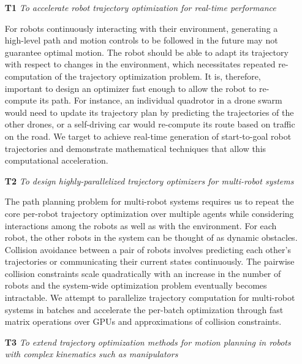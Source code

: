 \begin{enumerate}
    \item[\textbf{T1}] \textit{To accelerate robot trajectory optimization for real-time performance}\label{enum:problems-addressed-by-thesis}

    For robots continuously interacting with their environment, generating a high-level path and motion controls to be followed in the future may not guarantee optimal motion. The robot should be able to adapt its trajectory with respect to changes in the environment, which necessitates repeated re-computation of the trajectory optimization problem. It is, therefore, important to design an optimizer fast enough to allow the robot to re-compute its path. For instance, an individual quadrotor in a drone swarm would need to update its trajectory plan by predicting the trajectories of the other drones, or a self-driving car would re-compute its route based on traffic on the road. We target to achieve real-time generation of start-to-goal robot trajectories and demonstrate mathematical techniques that allow this computational acceleration.
    

    \item[\textbf{T2}] \textit{To design highly-parallelized trajectory optimizers for multi-robot systems}\label{intro:multi-robot_aim}

    The path planning problem for multi-robot systems requires us to repeat the core per-robot trajectory optimization over multiple agents while considering interactions among the robots as well as with the environment. For each robot, the other robots in the system can be thought of as dynamic obstacles. Collision avoidance between a pair of robots involves predicting each other's trajectories or communicating their current states continuously. The pairwise collision constraints scale quadratically with an increase in the number of robots and the system-wide optimization problem eventually becomes intractable. We attempt to parallelize trajectory computation for multi-robot systems in batches and accelerate the per-batch optimization through fast matrix operations over GPUs and approximations of collision constraints.

    \item[\textbf{T3}] \textit{To extend trajectory optimization methods for motion planning in robots with complex kinematics such as manipulators}\label{intro:manipulator_aim}


\end{enumerate}
